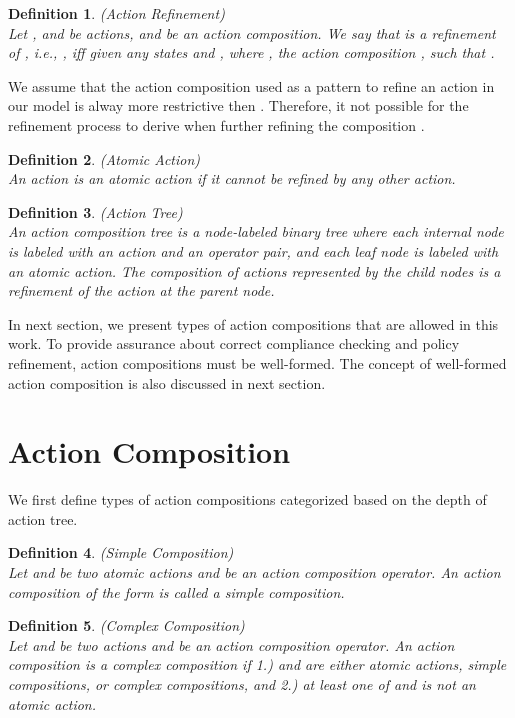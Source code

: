 \documentclass[12pt,journal,letterpaper,onecolumn]{IEEEtran}
\newtheorem{definition}{Definition}[section]
\begin{document}
\begin{definition}(Action Refinement)\\
Let ,  and  be actions, and
  be an action composition. We say that  is a refinement of , i.e., , iff given any states  and , where , the action
composition , such that
. \label{def:action-refinement}
\end{definition}

We assume that the action composition  used
as a pattern to refine an action  in our model is alway more 
restrictive then . Therefore, it not possible for the refinement
process to derive  when further refining the composition 
.


\begin{definition}(Atomic Action)\\
 An action  is an atomic action if it
cannot be refined by any other action.
\end{definition}

\begin{definition}(Action Tree)\\
An action composition tree is a node-labeled binary tree where each
internal node is labeled with an action and an operator pair, and
each leaf node is labeled with an atomic action. The composition of
actions represented by the child nodes is a refinement of the action
at the parent node.
\end{definition}


In next section, we present types of action compositions that are
allowed in this work. To provide assurance about correct compliance
checking and policy refinement, action compositions must be
well-formed. The concept of well-formed action composition is also
discussed in next section.

\section{Action Composition}
\label{sec:composition} We first define types of action compositions
categorized based on the depth of action tree.

\begin{definition}(Simple Composition)\\
Let  and  be two atomic actions and  be an action
composition operator. An action composition of the form  is called a simple composition. \label{def:simple}
\end{definition}

\begin{definition}(Complex Composition)\\
Let  and  be two actions and  be an action
composition operator. An action composition  is a
complex composition if 1.)  and  are either
 atomic actions, simple compositions, or complex compositions, and
 2.) at least one of  and  is not an atomic action.
\end{definition}
\end{document}

